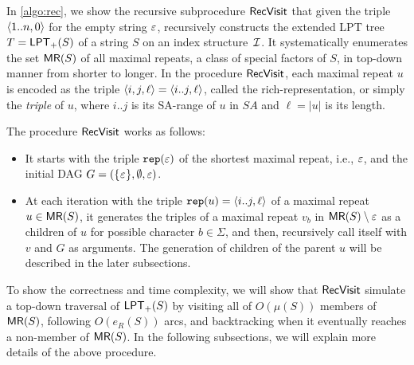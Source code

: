 \documentclass{article}
\begin{document}
In \cref{algo:rec}, we show the recursive subprocedure $\Rec$ that given the triple $\pair{1..n, 0}$ for the empty string $\eps$, recursively constructs the extended LPT tree $T = \LPT[+](S)$ of a string $S$ on an index structure~$\sig I$. It systematically enumerates the set $\MR(S)$ of all maximal repeats, a class of special factors of $S$, in top-down manner from shorter to longer. In the procedure $\Rec$, each maximal repeat $u$ is encoded as the triple $\pair{i, j, \ell} = \pair{i..j, \ell}$, called the rich-representation, or simply the \textit{triple} of $u$, where $i..j$ is its SA-range of $u$ in $SA$ and $\ell = |u|$ is its length.

The procedure $\Rec$ works as follows: 
\begin{itemize}
\item It starts with the triple $\op{rep}(\eps)$ of the shortest maximal repeat, i.e., $\eps$, and the initial DAG $G = (\set{\eps}, \emptyset{}, \eps)$. 
  
\item At each iteration with the triple $\op{rep}(u) = \pair{i..j, \ell}$ of a maximal repeat $u \in \MR(S)$, it generates the triples of a maximal repeat $v_b$ in $\MR(S)\setminus{\eps}$ as a children of $u$ for possible character $b\in\Sigma$, and then, recursively call itself with $v$ and $G$ as arguments. The generation of children of the parent $u$ will be described in the later subsections. 
\end{itemize}

To show the correctness and time complexity, we will show that $\Rec$ simulate a top-down traversal of $\LPT[+](S)$ by visiting all of $O(\mu(S))$ members of $\MR(S)$, following $O(e_R(S))$ arcs, and backtracking when it eventually reaches a non-member of $\MR(S)$.
In the following subsections, we will explain more details of the above procedure. 

\end{document}
